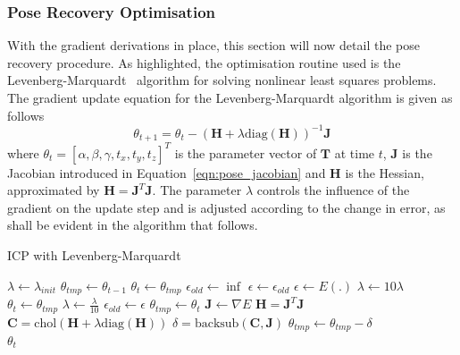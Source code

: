 \subsubsection{Pose Recovery Optimisation}
\label{subsub:moseg_static_camera_poserec_opt}
With the gradient derivations in place, this section will now detail the
pose recovery procedure. As highlighted, the optimisation routine used is the
Levenberg-Marquardt~\cite{NumericalRecipes} algorithm for solving nonlinear least
squares problems. The gradient update equation for the Levenberg-Marquardt
algorithm is given as follows
\begin{equation}
  \label{eqn:lm_update}
  \theta_{t+1} = \theta_{t} - (\bm{H} + \lambda \text{diag}(
  \bm{H}))^{-1}
  \bm{J}
\end{equation}
where \(\theta_{t} = [\alpha, \beta, \gamma, t_{x}, t_{y}, t_{z}]^{T}\) is the
parameter vector of \(\bm{T}\) at time \(t\), \(\bm{J}\) is the Jacobian
introduced in Equation~\ref{eqn:pose_jacobian} and \(\bm{H}\) is the Hessian,
approximated by \(\bm{H} = \bm{J}^{T}\bm{J}\). The parameter \(\lambda\)
controls the influence of the gradient on the update step and is adjusted
according to the change in error, as shall be evident in the algorithm
that follows.

{
  \centering
  \singlespacing
  \begin{minipage}{.7\linewidth}
    \begin{algorithm}[H]
      \label{alg:icp}
      \caption{ICP with Levenberg-Marquardt}
      \begin{algorithmic}[1]
        \State\(\lambda \gets \lambda_{init}\)
        \State\(\theta_{tmp} \gets \theta_{t-1}\)
        \State\(\theta_{t} \gets \theta_{tmp}\)
        \State\(\epsilon_{old} \gets \inf\)
        \State\(\epsilon \gets \epsilon_{old}\)
        \While{\(\epsilon >= \tau\)}
        \State\(\epsilon \gets E(.)\)
        \State\(\lambda \gets 10\lambda\)
        \State\(\theta_{t} \gets \theta_{tmp}\)
        \Else
        \State\(\lambda \gets \frac{\lambda}{10}\)
        \State\(\epsilon_{old} \gets \epsilon\)
        \State\(\theta_{tmp} \gets \theta_{t}\)
        \EndIf
        \State\(\bm{J} \gets \nabla E\)
        \State\(\bm{H} = \bm{J}^{T}\bm{J}\)
        \State\(\bm{C} = \text{chol}(\bm{H} + \lambda \text{diag}(\bm{H}))\)
        \State\(\delta = \text{backsub}(\bm{C}, \bm{J})\)
        \State\(\theta_{tmp} \gets \theta_{tmp} - \delta\)
        \EndWhile\\
        \Return\(\theta_{t}\)
        \EndProcedure
      \end{algorithmic}
    \end{algorithm}
  \end{minipage}
  \par
  
}

